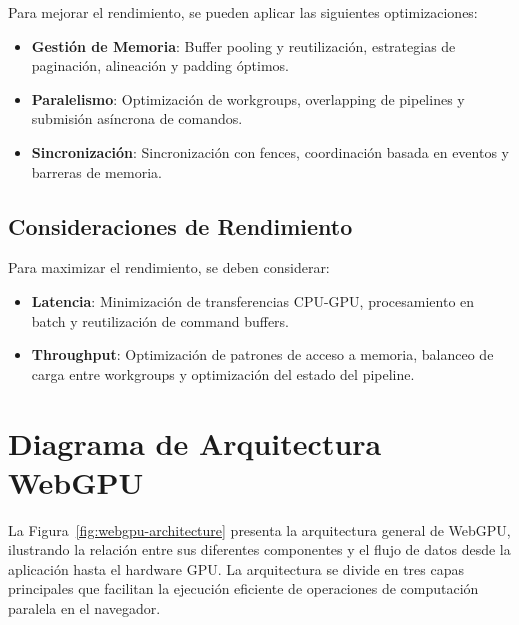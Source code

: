 Para mejorar el rendimiento, se pueden aplicar las siguientes optimizaciones:
\begin{itemize}
    \item \textbf{Gestión de Memoria}: Buffer pooling y reutilización, estrategias de paginación, alineación y padding óptimos.
    \item \textbf{Paralelismo}: Optimización de workgroups, overlapping de pipelines y submisión asíncrona de comandos.
    \item \textbf{Sincronización}: Sincronización con fences, coordinación basada en eventos y barreras de memoria.
\end{itemize}

\subsection{Consideraciones de Rendimiento}
\label{subsec:performance-considerations}

Para maximizar el rendimiento, se deben considerar:
\begin{itemize}
    \item \textbf{Latencia}: Minimización de transferencias CPU-GPU, procesamiento en batch y reutilización de command buffers.
    \item \textbf{Throughput}: Optimización de patrones de acceso a memoria, balanceo de carga entre workgroups y optimización del estado del pipeline.
\end{itemize}

\section{Diagrama de Arquitectura WebGPU}
\label{sec:webgpu-architecture-diagram}

La Figura~\ref{fig:webgpu-architecture} presenta la arquitectura general de WebGPU, ilustrando la relación entre sus diferentes componentes y el flujo de datos desde la aplicación hasta el hardware GPU. La arquitectura se divide en tres capas principales que facilitan la ejecución eficiente de operaciones de computación paralela en el navegador.

